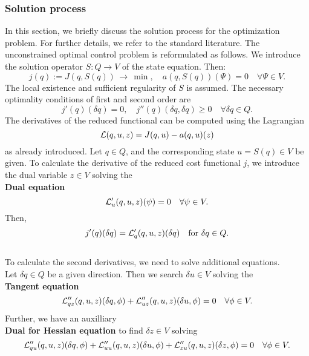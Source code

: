 {\subsubsection{Solution process}
In this section, we briefly discuss the solution process for the 
optimization problem. For further details, we refer to the standard literature.
The unconstrained optimal control problem is reformulated as follows. 
We introduce the solution operator $S:Q\rightarrow V$ of the state equation.
Then:
\begin{equation*}
j(q):= J(q,S(q))\, \rightarrow \, \min , \quad a(q,S(q))(\Psi) = 0 \quad 
\forall \Psi \in V.
\end{equation*}
The local existence and sufficient regularity of $S$ is assumed. The 
necessary optimality conditions of first and second order are
\begin{equation*}
j'(q)(\delta q) = 0 , \quad j''(q)(\delta q,\delta q) \geq 0 \quad 
\forall\delta q\in Q.
\end{equation*} 
The derivatives of the reduced functional can be computed using the 
Lagrangian
\begin{equation*}
{\cal L}(q,u,z) =J(q,u) - a(q,u)(z)
\end{equation*}
as already introduced. Let $q\in Q$, and the corresponding state $u=S(q)\in V$ 
be given. To calculate the derivative of the reduced cost functional $j$, 
we introduce the dual variable
$z\in V$ solving the\\[3mm]
%
\textbf{Dual equation}\\
\begin{equation*}
{\cal L}_u'(q,u,z)(\psi) = 0 \quad\forall\psi\in V.
\end{equation*}
Then,
\begin{equation*}
j'(q)(\delta q) = {\cal L}_q' (q,u,z)(\delta q) \quad \text{for }\delta q\in Q.
\end{equation*}
\\[2mm]
%
To calculate the second derivatives, we need to solve additional equations.\\
%
Let $\delta q\in Q$ be a given direction. Then we search $\delta u\in V$  
solving the\\[2mm]
%
\textbf{Tangent equation}\\
%
\begin{equation*}
{\cal L}_{qz}'' (q,u,z)(\delta q,\phi) + {\cal L}_{uz}'' (q,u,z)(\delta
u,\phi) = 0
\quad\forall \phi\in V.
\end{equation*}
Further, we have an auxilliary\\[2mm]  
%
\textbf{Dual for Hessian equation}
to find $\delta z\in V$ solving
\begin{equation*}
{\cal L}_{qu}'' (q,u,z)(\delta q,\phi) + {\cal L}_{uu}'' 
(q,u,z)(\delta u,\phi) + {\cal L}_{zu}'' (q,u,z)(\delta z,\phi) =0 
\quad\forall \phi\in V.
\end{equation*}

}

